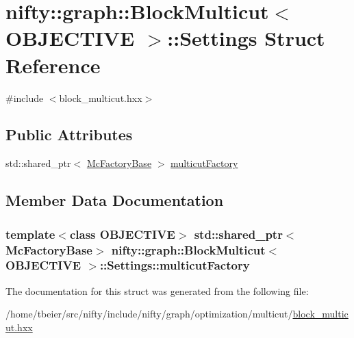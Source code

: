 \hypertarget{structnifty_1_1graph_1_1BlockMulticut_1_1Settings}{}\section{nifty\+:\+:graph\+:\+:Block\+Multicut$<$ O\+B\+J\+E\+C\+T\+I\+V\+E $>$\+:\+:Settings Struct Reference}
\label{structnifty_1_1graph_1_1BlockMulticut_1_1Settings}


{\ttfamily \#include $<$block\+\_\+multicut.\+hxx$>$}

\subsection*{Public Attributes}
\begin{DoxyCompactItemize}
\item 
std\+::shared\+\_\+ptr$<$ \hyperlink{classnifty_1_1graph_1_1BlockMulticut_a59d6c0f5c4f2b8cf5c715371fab907a7}{Mc\+Factory\+Base} $>$ \hyperlink{structnifty_1_1graph_1_1BlockMulticut_1_1Settings_a96dfdae7a038a365287241f981c2a491}{multicut\+Factory}
\end{DoxyCompactItemize}


\subsection{Member Data Documentation}
\hypertarget{structnifty_1_1graph_1_1BlockMulticut_1_1Settings_a96dfdae7a038a365287241f981c2a491}{}
\subsubsection[{multicut\+Factory}]{\setlength{\rightskip}{0pt plus 5cm}template$<$class O\+B\+J\+E\+C\+T\+I\+V\+E$>$ std\+::shared\+\_\+ptr$<${\bf Mc\+Factory\+Base}$>$ {\bf nifty\+::graph\+::\+Block\+Multicut}$<$ O\+B\+J\+E\+C\+T\+I\+V\+E $>$\+::Settings\+::multicut\+Factory}\label{structnifty_1_1graph_1_1BlockMulticut_1_1Settings_a96dfdae7a038a365287241f981c2a491}


The documentation for this struct was generated from the following file\+:\begin{DoxyCompactItemize}
\item 
/home/tbeier/src/nifty/include/nifty/graph/optimization/multicut/\hyperlink{block__multicut_8hxx}{block\+\_\+multicut.\+hxx}\end{DoxyCompactItemize}
